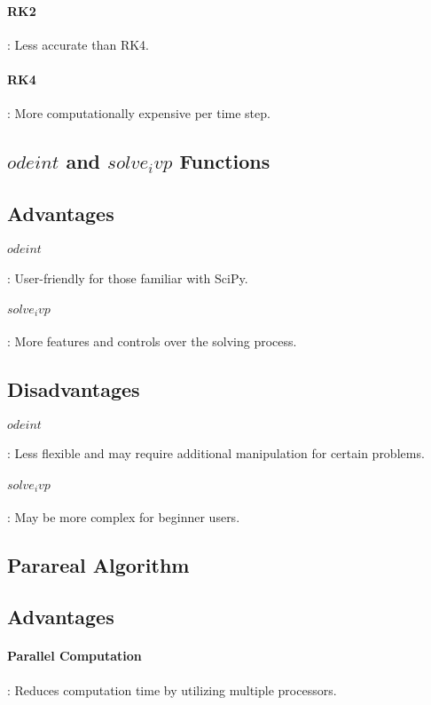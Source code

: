 \documentclass{article}
\begin{document}
\paragraph{RK2}: Less accurate than RK4.

\paragraph{RK4}:  More computationally expensive per time step.

\subsection{$odeint$ and $solve_ivp$ Functions}
\subsection{Advantages}
\paragraph{$odeint$}: User-friendly for those familiar with SciPy.

\paragraph{$solve_ivp$}: More features and controls over the solving process.

\subsection{Disadvantages}
\paragraph{$odeint$}: Less flexible and may require additional manipulation for certain problems.

\paragraph{$solve_ivp$}: May be more complex for beginner users.

\subsection{Parareal Algorithm}
\subsection{Advantages}
\paragraph{Parallel Computation}: Reduces computation time by utilizing multiple processors.
\end{document}
